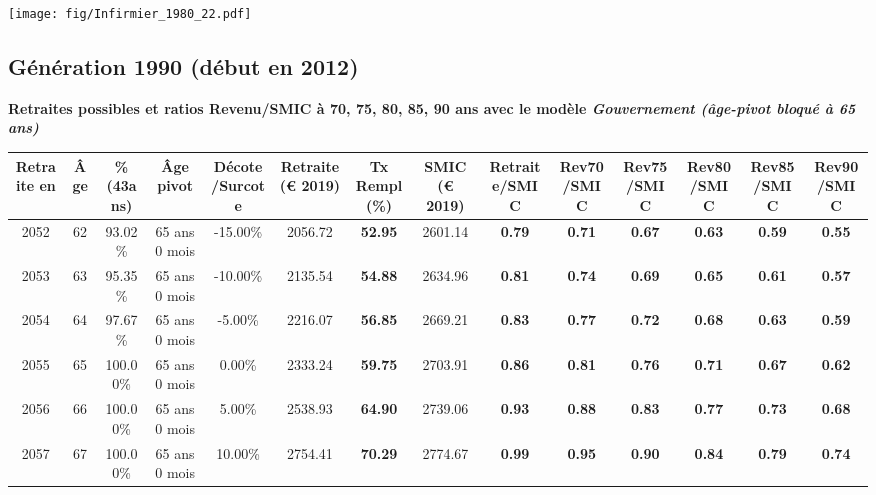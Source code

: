  \begin{center}\texttt{[image: fig/Infirmier\_1980\_22.pdf]}\end{center} \label{fig/Infirmier_1980_22.pdf} 

\newpage 
 
\subsection{Génération 1990 (début en 2012)} 

{\bf \noindent Retraites possibles et ratios Revenu/SMIC à 70, 75, 80, 85, 90 ans avec le modèle \emph{Gouvernement (âge-pivot bloqué à 65 ans)}}  
 
\begin{adjustbox}{max width=\textwidth} 
\begin{tabular}[htb]{|c|c||c|c|c||c|c||c||c|c|c|c|c|c|} 
\hline 
 Retraite en &  Âge &  \%(43ans) &  Âge pivot &  Décote/Surcote &  Retraite (\euro{} 2019) &  Tx Rempl(\%) &  SMIC (\euro{} 2019) &  Retraite/SMIC &  Rev70/SMIC &  Rev75/SMIC &  Rev80/SMIC &  Rev85/SMIC &  Rev90/SMIC \\ 
\hline \hline 
 2052 &  62 &  93.02\% &  65 ans 0 mois &  -15.00\% &  2056.72 &  {\bf 52.95} &  2601.14 &  {\bf {\color{red} 0.79}} &  {\bf {\color{red} 0.71}} &  {\bf {\color{red} 0.67}} &  {\bf {\color{red} 0.63}} &  {\bf {\color{red} 0.59}} &  {\bf {\color{red} 0.55}} \\ 
\hline 
 2053 &  63 &  95.35\% &  65 ans 0 mois &  -10.00\% &  2135.54 &  {\bf 54.88} &  2634.96 &  {\bf {\color{red} 0.81}} &  {\bf {\color{red} 0.74}} &  {\bf {\color{red} 0.69}} &  {\bf {\color{red} 0.65}} &  {\bf {\color{red} 0.61}} &  {\bf {\color{red} 0.57}} \\ 
\hline 
 2054 &  64 &  97.67\% &  65 ans 0 mois &  -5.00\% &  2216.07 &  {\bf 56.85} &  2669.21 &  {\bf {\color{red} 0.83}} &  {\bf {\color{red} 0.77}} &  {\bf {\color{red} 0.72}} &  {\bf {\color{red} 0.68}} &  {\bf {\color{red} 0.63}} &  {\bf {\color{red} 0.59}} \\ 
\hline 
 2055 &  65 &  100.00\% &  65 ans 0 mois &  0.00\% &  2333.24 &  {\bf 59.75} &  2703.91 &  {\bf {\color{red} 0.86}} &  {\bf {\color{red} 0.81}} &  {\bf {\color{red} 0.76}} &  {\bf {\color{red} 0.71}} &  {\bf {\color{red} 0.67}} &  {\bf {\color{red} 0.62}} \\ 
\hline 
 2056 &  66 &  100.00\% &  65 ans 0 mois &  5.00\% &  2538.93 &  {\bf 64.90} &  2739.06 &  {\bf {\color{red} 0.93}} &  {\bf {\color{red} 0.88}} &  {\bf {\color{red} 0.83}} &  {\bf {\color{red} 0.77}} &  {\bf {\color{red} 0.73}} &  {\bf {\color{red} 0.68}} \\ 
\hline 
 2057 &  67 &  100.00\% &  65 ans 0 mois &  10.00\% &  2754.41 &  {\bf 70.29} &  2774.67 &  {\bf {\color{red} 0.99}} &  {\bf {\color{red} 0.95}} &  {\bf {\color{red} 0.90}} &  {\bf {\color{red} 0.84}} &  {\bf {\color{red} 0.79}} &  {\bf {\color{red} 0.74}} \\ 
\hline 
\hline 
\end{tabular} 
\end{adjustbox} 
 
